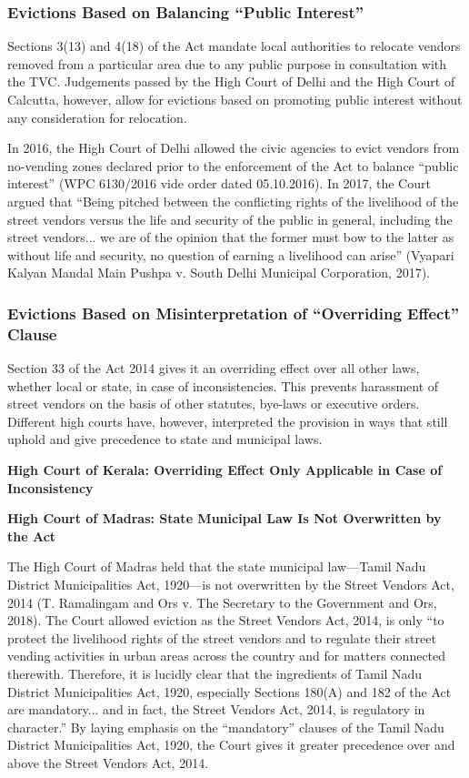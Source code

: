 \documentclass[a4paper, 12pt, twoside]{article}
\begin{document}
\subsubsection*{Evictions Based on Balancing “Public Interest”}

Sections 3(13) and 4(18) of the Act mandate local authorities to relocate vendors removed from a particular area due to any public purpose in consultation with the TVC. Judgements passed by the High Court of Delhi and the High Court of Calcutta, however, allow for evictions based on promoting public interest without any consideration for relocation.

In 2016, the High Court of Delhi allowed the civic agencies to evict vendors from no-vending zones declared prior to the enforcement of the Act to balance “public interest” (WPC 6130/2016 vide order dated 05.10.2016). In 2017, the Court argued that “Being pitched between the conflicting rights of the livelihood of the street vendors versus the life and security of the public in general, including the street vendors... we are of the opinion that the former must bow to the latter as without life and security, no question of earning a livelihood can arise” (Vyapari Kalyan Mandal Main Pushpa v. South Delhi Municipal Corporation, 2017).


\subsubsection*{Evictions Based on Misinterpretation of “Overriding Effect” Clause}

Section 33 of the Act 2014 gives it an overriding effect over all other laws, whether local or state, in case of inconsistencies. This prevents harassment of street vendors on the basis of other statutes, bye-laws or executive orders. Different high courts have, however, interpreted the provision in ways that still uphold and give precedence to state and municipal laws.

\textbf{High Court of Kerala: Overriding Effect Only Applicable in Case of Inconsistency}



\textbf{High Court of Madras: State Municipal Law Is Not Overwritten by the Act}

The High Court of Madras held that the state municipal law—Tamil Nadu District Municipalities Act, 1920—is not overwritten by the Street Vendors Act, 2014 (T. Ramalingam and Ors v. The Secretary to the Government and Ors, 2018). The Court allowed eviction as the Street Vendors Act, 2014, is only “to protect the livelihood rights of the street vendors and to regulate their street vending activities in urban areas across the country and for matters connected therewith. Therefore, it is lucidly clear that the ingredients of Tamil Nadu District Municipalities Act, 1920, especially Sections 180(A) and 182 of the Act  are mandatory... and in fact, the Street Vendors Act, 2014, is regulatory in character.” By laying emphasis on the “mandatory” clauses of the Tamil Nadu District Municipalities Act, 1920, the Court gives it greater precedence over and above the Street Vendors Act, 2014.
\end{document}
